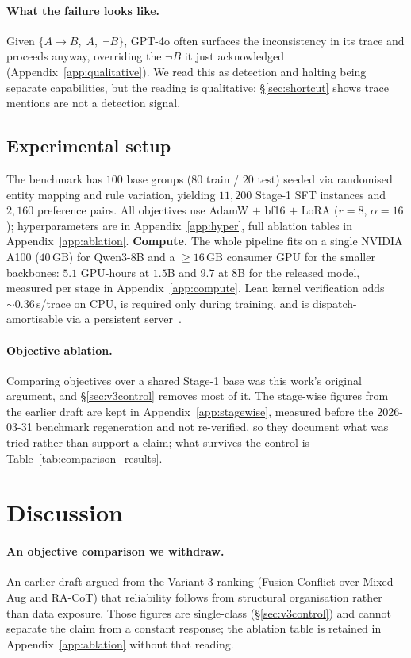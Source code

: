 \documentclass{article}
\begin{document}
\paragraph{What the failure looks like.} Given $\{A \to B,\; A,\; \neg B\}$, GPT-4o often surfaces the inconsistency in its trace and proceeds anyway, overriding the $\neg B$ it just acknowledged (Appendix~\ref{app:qualitative}). We read this as detection and halting being separate capabilities, but the reading is qualitative: \S\ref{sec:shortcut} shows trace mentions are not a detection signal.

\subsection{Experimental setup}
The benchmark has $100$ base groups ($80$ train / $20$ test) seeded via randomised entity mapping and rule variation, yielding $11{,}200$ Stage-1 SFT instances and $2{,}160$ preference pairs. All objectives use AdamW $+$ bf16 $+$ LoRA ($r{=}8$, $\alpha{=}16$); hyperparameters are in Appendix~\ref{app:hyper}, full ablation tables in Appendix~\ref{app:ablation}. \textbf{Compute.} The whole pipeline fits on a single NVIDIA A100 ($40$\,GB) for Qwen3-8B and a $\geq16$\,GB consumer GPU for the smaller backbones: $5.1$ GPU-hours at $1.5$B and $9.7$ at $8$B for the released model, measured per stage in Appendix~\ref{app:compute}. Lean kernel verification adds $\sim\!0.36$\,s/trace on CPU, is required only during training, and is dispatch-amortisable via a persistent server~\citep{yang2023leandojo}.

\paragraph{Objective ablation.}
Comparing objectives over a shared Stage-1 base was this work's original
argument, and \S\ref{sec:v3control} removes most of it. The stage-wise figures
from the earlier draft are kept in Appendix~\ref{app:stagewise}, measured
before the 2026-03-31 benchmark regeneration and not re-verified, so they
document what was tried rather than support a claim; what survives the control
is Table~\ref{tab:comparison_results}.

\section{Discussion}

\paragraph{An objective comparison we withdraw.} An earlier draft argued from
the Variant-3 ranking (Fusion-Conflict over Mixed-Aug and RA-CoT) that
reliability follows from structural organisation rather than data exposure.
Those figures are single-class (\S\ref{sec:v3control}) and cannot separate the
claim from a constant response; the ablation table is retained in
Appendix~\ref{app:ablation} without that reading.
\end{document}
